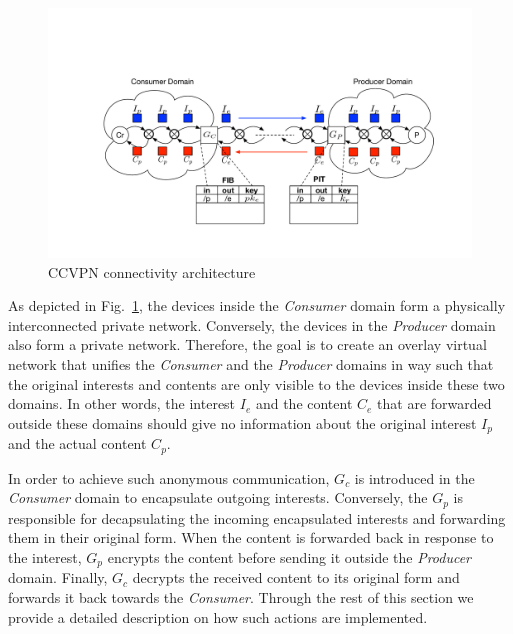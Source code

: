 \documentclass[conference,letterpaper,10pt]{IEEEtran}
\begin{document}
\begin{figure}[!ht]
\centering
\includegraphics[width=2\columnwidth]{ccvpn.pdf}
\caption{CCVPN connectivity architecture}
\label{fig:ccvpn}
\end{figure}

As depicted in Fig.~\ref{fig:ccvpn}, the devices inside the \textit{Consumer} domain form a physically interconnected private network. Conversely, the devices in the \textit{Producer} domain also form a private network. Therefore, the goal is to create an overlay virtual network that unifies the \textit{Consumer} and the \textit{Producer} domains in way such that the original interests and contents are only visible to the devices inside these two domains. In other words, the interest $I_e$ and the content $C_e$ that are forwarded outside these domains should give no information about the original interest $I_p$ and the actual content $C_p$.


In order to achieve such anonymous communication, $G_c$ is introduced in the \textit{Consumer} domain to encapsulate outgoing interests. Conversely, the $G_p$ is responsible for decapsulating the incoming encapsulated interests and forwarding them in their original form. When the content is forwarded back in response to the interest, $G_p$ encrypts the content before sending it outside the \textit{Producer} domain. Finally, $G_c$ decrypts the received content to its original form and forwards it back towards the \textit{Consumer}. Through the rest of this section we provide a detailed description on how such actions are implemented.
\end{document}
